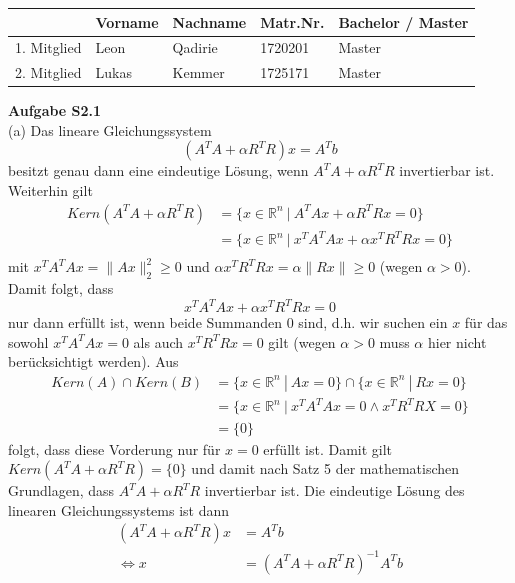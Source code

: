 \documentclass[ngerman, a4paper,12pt]{article}
\begin{document}
\begin{table}[h]
	\centering
	\begin{tabularx}{\textwidth}{X X X X X}
		 & Vorname & Nachname & Matr.Nr. & Bachelor / Master \\
		\toprule
		1. Mitglied & Leon & Qadirie & 1720201 &  Master\\
		2. Mitglied & Lukas & Kemmer & 1725171 &  Master\\
		\bottomrule
	\end{tabularx}
\end{table}
\textbf{Aufgabe S2.1} \\
(a) Das lineare Gleichungssystem
\begin{equation}
  (A^TA+\alpha R^TR)x=A^Tb
\end{equation}
besitzt genau dann eine eindeutige Lösung, wenn $A^TA+\alpha R^TR$ invertierbar ist. Weiterhin gilt
\begin{equation*}
	\begin{split}
		Kern(A^TA + \alpha R^T R) &= \{x \in \mathbb{R}^n \ | \ A^TAx + \alpha R^TRx = 0 \} \\
	&=\{x \in \mathbb{R}^n \ | \ x^TA^TAx + \alpha x^TR^TRx = 0 \} \\
	\end{split}
\end{equation*}
mit $x^TA^TAx = \| Ax \| _2^2 \geq 0$ und $\alpha x^TR^TRx = \alpha \| Rx \| \geq 0$ (wegen $\alpha >0$). Damit folgt, dass 
\begin{equation}
	x^TA^TAx + \alpha x^TR^TRx = 0
\end{equation}
nur dann erfüllt ist, wenn beide Summanden $0$ sind, d.h. wir suchen ein $x$ für das sowohl $x^TA^TAx=0$ als auch $x^TR^TRx=0$ gilt (wegen $\alpha>0$ muss $\alpha$ hier nicht berücksichtigt werden). Aus
\begin{equation*}
	\begin{split}
		Kern(A) \cap Kern(B) &= \{x \in \mathbb{R}^n \ | \ Ax=0 \} \cap \{x \in \mathbb{R}^n \ | \ Rx=0 \} \\
		&=\{x \in \mathbb{R}^n \ | \ x^TA^TAx=0 \land x^TR^TRX=0 \} \\
		&=\{0\}
	\end{split}
\end{equation*}
folgt, dass diese Vorderung nur für $x=0$ erfüllt ist. Damit gilt $Kern(A^TA + \alpha R^TR) = \{0\}$ und damit nach Satz 5 der mathematischen Grundlagen, dass $A^TA + \alpha R^TR$ invertierbar ist. Die eindeutige Lösung des linearen Gleichungssystems ist dann
\begin{equation*}
	\begin{split}
	(A^TA+\alpha R^TR)x &=A^Tb \\
	\Leftrightarrow x&= (A^TA+\alpha R^TR)^{-1} A^Tb	
	\end{split}
\end{equation*}
\end{document}
